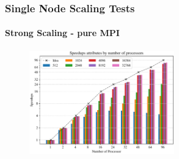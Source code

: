 \begin{frame}
  \frametitle{Single Node Scaling Tests}
  \framesubtitle{Strong Scaling - pure MPI}
  \begin{figure}[htbp]
    \centering
    \includegraphics[width=0.56\textwidth]{figure/FIG_Benchmark_pure_mpi.pdf}
    \label{FIG:Benchmark:PURE_MPI}
  \end{figure}
\end{frame}



